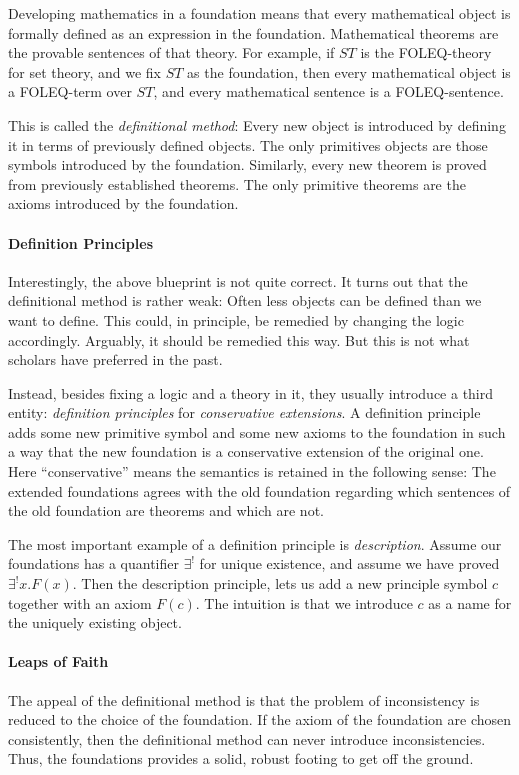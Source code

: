 Developing mathematics in a foundation means that every mathematical object is formally defined as an expression in the foundation. Mathematical theorems are the provable sentences of that theory. For example, if $ST$ is the FOLEQ-theory for set theory, and we fix $ST$ as the foundation, then every mathematical object is a FOLEQ-term over $ST$, and every mathematical sentence is a FOLEQ-sentence.

This is called the \emph{definitional method}: Every new object is introduced by defining it in terms of previously defined objects. The only primitives objects are those symbols introduced by the foundation. Similarly, every new theorem is proved from previously established theorems. The only primitive theorems are the axioms introduced by the foundation.

\paragraph{Definition Principles}
Interestingly, the above blueprint is not quite correct. It turns out that the definitional method is rather weak: Often less objects can be defined than we want to define. This could, in principle, be remedied by changing the logic accordingly. Arguably, it should be remedied this way. But this is not what scholars have preferred in the past.

Instead, besides fixing a logic and a theory in it, they usually introduce a third entity: \emph{definition principles} for \emph{conservative extensions}. A definition principle adds some new primitive symbol and some new axioms to the foundation in such a way that the new foundation is a conservative extension of the original one. Here ``conservative'' means the semantics is retained in the following sense: The extended foundations agrees with the old foundation regarding which sentences of the old foundation are theorems and which are not.

The most important example of a definition principle is \emph{description}. Assume our foundations has a quantifier $\exists^!$ for unique existence, and assume we have proved $\exists^! x.F(x)$. Then the description principle, lets us add a new principle symbol $c$ together with an axiom $F(c)$. The intuition is that 
we introduce $c$ as a name for the uniquely existing object.

\paragraph{Leaps of Faith}
The appeal of the definitional method is that the problem of inconsistency is reduced to the choice of the foundation. If the axiom of the foundation are chosen consistently, then the definitional method can never introduce inconsistencies. Thus, the foundations provides a solid, robust footing to get off the ground.

